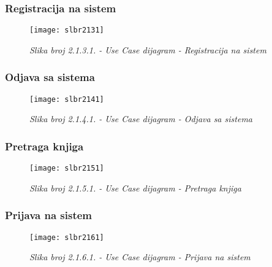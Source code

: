 \documentclass[a4paper oneside ,12pt]{article}
\begin{document}
\subsubsection{Registracija na sistem}
\begin{center}
\begin{figure}[H] 
\begin{center}
\texttt{[image: slbr2131]}
\caption*{\textit{Slika broj 2.1.3.1. - Use Case dijagram - Registracija na sistem}}
\end{center}
\end{figure}
\end{center}

\subsubsection{Odjava sa sistema}
\begin{center}
\begin{figure}[H] 
\begin{center}
\texttt{[image: slbr2141]}
\caption*{\textit{Slika broj 2.1.4.1. - Use Case dijagram - Odjava sa sistema}}
\end{center}
\end{figure}
\end{center}

\subsubsection{Pretraga knjiga}
\begin{center}
\begin{figure}[H] 
\begin{center}
\texttt{[image: slbr2151]}
\caption*{\textit{Slika broj 2.1.5.1. - Use Case dijagram - Pretraga knjiga}}
\end{center}
\end{figure}
\end{center}

\subsubsection{Prijava na sistem}
\begin{center}
\begin{figure}[H] 
\begin{center}
\texttt{[image: slbr2161]}
\caption*{\textit{Slika broj 2.1.6.1. - Use Case dijagram - Prijava na sistem}}
\end{center}
\end{figure}
\end{center}
\end{document}
